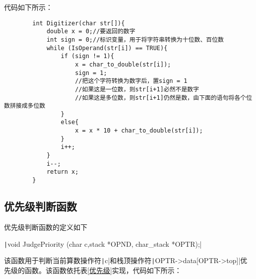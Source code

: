 \documentclass[10pt,a4paper]{article}
\begin{document}
	\noindent 代码如下所示：
	\begin{verbatim}
		int Digitizer(char str[]){
			double x = 0;//要返回的数字
			int sign = 0;//标识变量，用于将字符串转换为十位数、百位数
			while (IsOperand(str[i]) == TRUE){
				if (sign != 1){
					x = char_to_double(str[i]);
					sign = 1;
					//把这个字符转换为数字后，置sign = 1
					//如果这是一位数，则str[i+1]必然不是数字
					//如果这是多位数，则str[i+1]仍然是数，由下面的语句将各个位数拼接成多位数
				}
				else{
					x = x * 10 + char_to_double(str[i]);
				}
				i++;
			}
			i--;
			return x;
		}
	\end{verbatim}
	\subsection{优先级判断函数}
	\noindent 优先级判断函数的定义如下
	\begin{center}
		\texttt|void JudgePriority (char c,stack *OPND, char_stack *OPTR);|
	\end{center}
	该函数用于判断当前算数操作符\texttt|c|和栈顶操作符\texttt|OPTR->data[OPTR->top]|优先级的函数。该函数依托表\ref{优先级}实现，代码如下所示：
\end{document}
